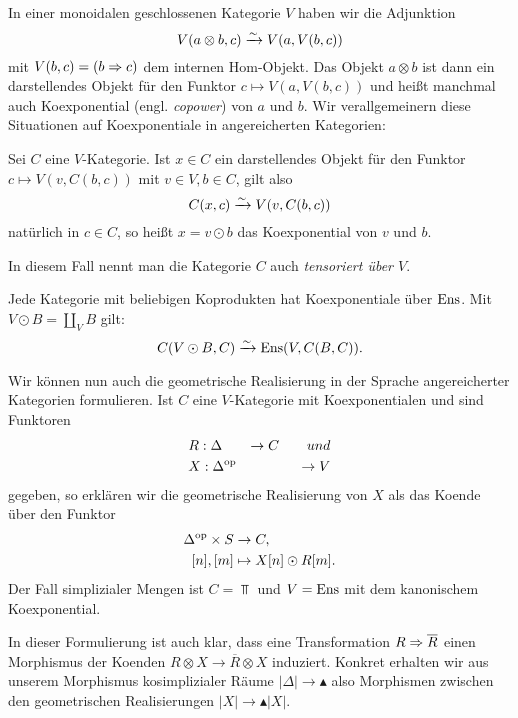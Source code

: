 In einer monoidalen geschlossenen Kategorie $V$ haben wir die Adjunktion
\[ V(a \otimes b, c) \xrightarrow[]{\sim} V(a, V(b, c)) \]
mit $V(b, c) = (b \Rightarrow c)$ dem internen Hom-Objekt. Das Objekt $a
\otimes b$ ist dann ein darstellendes Objekt für den Funktor $c
\mapsto V(a, V(b, c))$ und heißt manchmal auch Koexponential
(engl. \emph{copower}) von $a$ und $b$. Wir verallgemeinern diese
Situationen auf Koexponentiale in angereicherten Kategorien:
\begin{defn} \label{copower}
  Sei $C$ eine $V$-Kategorie. Ist $x \in C$ ein darstellendes Objekt
  für den Funktor $c \mapsto V(v, C(b, c))$ mit $v \in V, b \in C$,
  gilt also
  \[ C(x, c) \xrightarrow[]{\sim} V(v, C(b, c)) \]
  natürlich in $c \in C$, so heißt $x = v \odot b$ das Koexponential
  von $v$ und $b$.  
\end{defn}
In diesem Fall nennt man die Kategorie $C$ auch \emph{tensoriert über
  $V$}.
\begin{bsp}
  Jede Kategorie mit beliebigen Koprodukten hat Koexponentiale über
  $\operatorname{Ens}$. Mit $V \odot B = \coprod_V B$ gilt:
  \[ C(V \odot B, C) \xrightarrow[]{\sim} \operatorname{Ens}(V, C(B, C)). \]
\end{bsp}

Wir können nun auch die geometrische Realisierung in der Sprache
angereicherter Kategorien formulieren. Ist $C$ eine $V$-Kategorie mit
Koexponentialen und sind Funktoren
\begin{align*}
  &R: \Delta &\to C \qquad{und} \\
  &X: \Delta^\mathrm{op} &\to V
\end{align*}
gegeben, so erklären wir die geometrische Realisierung von $X$ als das
Koende über den Funktor
\begin{align*}
  \Delta^\mathrm{op} \times S &\to C, \\
  [n], [m] &\mapsto X[n] \odot R[m].
\end{align*}
Der Fall simplizialer Mengen ist $C = \Top$ und $V = \operatorname{Ens}$ mit dem
kanonischem Koexponential.

\begin{bem} \label{real-model-natural}
  In dieser Formulierung ist auch klar, dass eine Transformation $R
  \Rightarrow \overline{R}$ einen Morphismus der Koenden $R \otimes X \to
  \overline{R} \otimes X$ induziert. Konkret erhalten wir aus unserem
  Morphismus kosimplizialer Räume $|\Delta| \to \blacktriangle$ also
  Morphismen zwischen den geometrischen Realisierungen $|X| \to
  \blacktriangle |X|$.
\end{bem}


